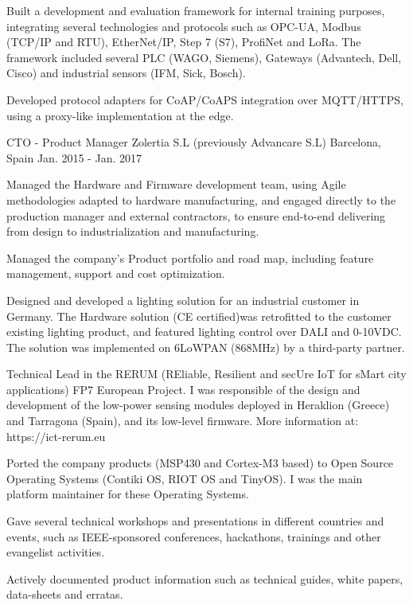 \begin{cventries}
{\begin{cvitems}
        \item {Built a development and evaluation framework for internal training purposes, integrating several technologies and protocols such as OPC-UA, Modbus (TCP/IP and RTU), EtherNet/IP, Step 7 (S7), ProfiNet and LoRa. The framework included several PLC (WAGO, Siemens), Gateways (Advantech, Dell, Cisco) and industrial sensors (IFM, Sick, Bosch).}
        \item {Developed protocol adapters for CoAP/CoAPS integration over MQTT/HTTPS, using a proxy-like implementation at the edge.}
      \end{cvitems}
    }

  \cventry
    {CTO - Product Manager} %
    {Zolertia S.L (previously Advancare S.L)} %
    {Barcelona, Spain} %
    {Jan. 2015 - Jan. 2017} %
    {
      \begin{cvitems} %
        \item {Managed the Hardware and Firmware development team, using Agile methodologies adapted to hardware manufacturing, and engaged directly to the production manager and external contractors, to ensure end-to-end delivering from design to industrialization and manufacturing.}
        \item {Managed the company's Product portfolio and road map, including feature management, support and cost optimization.}
        \item {Designed and developed a lighting solution for an industrial customer in Germany.  The Hardware solution (CE certified)was retrofitted to the customer existing lighting product, and featured lighting control over DALI and 0-10VDC.  The solution was implemented on 6LoWPAN (868MHz) by a third-party partner.}
        \item {Technical Lead in the RERUM (REliable, Resilient and secUre IoT for sMart city applications) FP7 European Project.  I was responsible of the design and development of the low-power sensing modules deployed in Heraklion (Greece) and Tarragona (Spain), and its low-level firmware.  More information at: https://ict-rerum.eu}
        \item {Ported the company products (MSP430 and Cortex-M3 based) to Open Source Operating Systems (Contiki OS, RIOT OS and TinyOS). I was the main platform maintainer for these Operating Systems.}
        \item {Gave several technical workshops and presentations in different countries and events, such as IEEE-sponsored conferences, hackathons, trainings and other evangelist activities.}
        \item {Actively documented product information such as technical guides, white papers, data-sheets and erratas.}
      \end{cvitems}
    }


\end{cventries}
